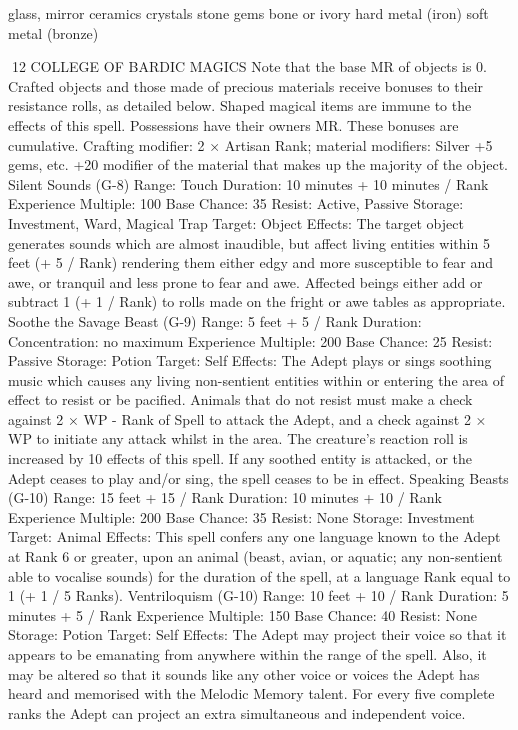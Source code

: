 \documentclass[a4paper]{article}
\begin{document}
\begin{multicols}{3}
glass, mirror
ceramics
crystals
stone
gems
bone or ivory
hard metal (iron)
soft metal (bronze)

12 COLLEGE OF BARDIC MAGICS
Note that the base MR of objects is 0. Crafted
objects and those made of precious materials receive bonuses to their resistance rolls, as detailed
below. Shaped magical items are immune to the
effects of this spell. Possessions have their owners
MR. These bonuses are cumulative. Crafting modifier: 2 × Artisan Rank; material modifiers: Silver
+5%
gems, etc. +20%
modifier of the material that makes up the majority
of the object.
Silent Sounds (G-8)
Range: Touch
Duration: 10 minutes + 10 minutes / Rank
Experience Multiple: 100
Base Chance: 35%
Resist: Active, Passive
Storage: Investment, Ward, Magical Trap
Target: Object
Effects: The target object generates sounds which
are almost inaudible, but affect living entities
within 5 feet (+ 5 / Rank) rendering them either
edgy and more susceptible to fear and awe, or
tranquil and less prone to fear and awe. Affected
beings either add or subtract 1 (+ 1 / Rank) to rolls
made on the fright or awe tables as appropriate.
Soothe the Savage Beast (G-9)
Range: 5 feet + 5 / Rank
Duration: Concentration: no maximum
Experience Multiple: 200
Base Chance: 25%
Resist: Passive
Storage: Potion
Target: Self
Effects: The Adept plays or sings soothing music
which causes any living non-sentient entities
within or entering the area of effect to resist or be
pacified. Animals that do not resist must make a
check against 2 × WP - Rank of Spell to attack the
Adept, and a check against 2 × WP to initiate any
attack whilst in the area. The creature’s reaction
roll is increased by 10%
effects of this spell. If any soothed entity is attacked, or the Adept ceases to play and/or sing, the
spell ceases to be in effect.
Speaking Beasts (G-10)
Range: 15 feet + 15 / Rank
Duration: 10 minutes + 10 / Rank
Experience Multiple: 200
Base Chance: 35%
Resist: None
Storage: Investment
Target: Animal
Effects: This spell confers any one language known
to the Adept at Rank 6 or greater, upon an animal
(beast, avian, or aquatic; any non-sentient able to
vocalise sounds) for the duration of the spell, at a
language Rank equal to 1 (+ 1 / 5 Ranks).
Ventriloquism (G-10)
Range: 10 feet + 10 / Rank
Duration: 5 minutes + 5 / Rank
Experience Multiple: 150
Base Chance: 40%
Resist: None
Storage: Potion
Target: Self
Effects: The Adept may project their voice so that
it appears to be emanating from anywhere within
the range of the spell. Also, it may be altered so
that it sounds like any other voice or voices the
Adept has heard and memorised with the Melodic
Memory talent. For every five complete ranks the
Adept can project an extra simultaneous and independent voice.


\end{multicols}
\end{document}
